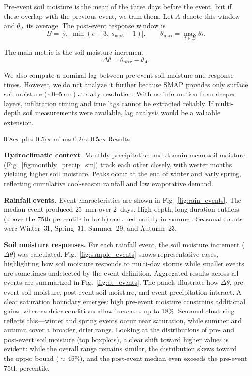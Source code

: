 \documentclass[9pt, twocolumn]{extarticle}
\makeatletter
\renewcommand\section{\@startsection{section}{1}{0pt}%
  {0.8ex plus 0.5ex minus 0.2ex}%
  {0.5ex}%
  {\normalfont\Large\bfseries}}
\makeatother
\begin{document}
Pre-event soil moisture is the mean of the three days before the event, but if these overlap with the previous event, we trim them. Let \(A\) denote this window and \(\theta_A\) its average. The post-event response window is
\[
B = \big[s,\; \min(e+3,\; s_{\mathrm{next}}-1)\big],
\qquad 
\theta_{\max} = \max_{t \in B} \theta_t .
\]

The main metric is the soil moisture increment  
\[
\Delta \theta = \theta_{\max} - \theta_A .
\]

We also compute a nominal lag between pre-event soil moisture and response times. However, we do not analyze it further because SMAP provides only surface soil moisture (\(\sim\)0--5 cm) at daily resolution. With no information from deeper layers, infiltration timing and true lags cannot be extracted reliably. If multi-depth soil measurements were available, lag analysis would be a valuable extension.  

\section{Results}

\textbf{Hydroclimatic context.} Monthly precipitation and domain-mean soil moisture (Fig.~\ref{fig:monthly_precip_sm}) track each other closely, with wetter months yielding higher soil moisture. Peaks occur at the end of winter and early spring, reflecting cumulative cool-season rainfall and low evaporative demand.

\textbf{Rainfall events.} Event characteristics are shown in Fig.~\ref{fig:rain_events}. The median event produced 25~mm over 2~days. High-depth, long-duration outliers (above the 75th percentile in both) occurred mainly in summer. Seasonal counts were Winter~31, Spring~31, Summer~29, and Autumn~23.

\textbf{Soil moisture responses.} For each rainfall event, the soil moisture increment ($\Delta \theta$) was calculated. Fig.~\ref{fig:sample_events} shows representative cases, highlighting how soil moisture responds to multi-day storms while smaller events are sometimes undetected by the event definition. Aggregated results across all events are summarized in Fig.~\ref{fig:dt_events}. The panels illustrate how $\Delta \theta$, pre-event soil moisture, post-event soil moisture, and event precipitation interact. A clear saturation boundary emerges: high pre-event moisture constrains additional gains, whereas drier conditions allow increases up to 18\%. Seasonal clustering reflects this—winter and spring events occur near saturation, while summer and autumn cover a broader, drier range. Looking at the distributions of pre- and post-event soil moisture (top boxplots), a clear shift toward higher values is evident: while the overall range remains similar, the distribution skews toward the upper bound ($\approx$45\%), and the post-event median even exceeds the pre-event 75th percentile.
\end{document}

